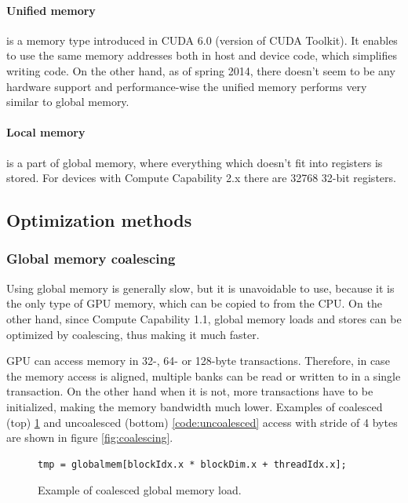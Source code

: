 \paragraph{Unified memory} is a memory type introduced in CUDA 6.0 (version of CUDA Toolkit). It enables to use the same memory addresses both in host and device code, which simplifies writing code. On the other hand, as of spring 2014, there doesn't seem to be any hardware support and performance-wise the unified memory performs very similar to global memory.

\paragraph{Local memory} is a part of global memory, where everything which doesn't fit into registers is stored. For devices with Compute Capability 2.x there are 32768 32-bit registers.



\subsection{Optimization methods}\label{subsec:optimization}

\subsubsection{Global memory coalescing}\label{subsubsec:cuda-coalescing}

Using global memory is generally slow, but it is unavoidable to use, because it is the only type of GPU memory, which can be copied to from the CPU. On the other hand, since Compute Capability 1.1, global memory loads and stores can be optimized by coalescing, thus making it much faster.

GPU can access memory in 32-, 64- or 128-byte transactions. Therefore, in case the memory access is aligned, multiple banks can be read or written to in a single transaction. On the other hand when it is not, more transactions have to be initialized, making the memory bandwidth much lower. Examples of coalesced (top) \ref{code:coalesced} and uncoalesced (bottom) \ref{code:uncoalesced} access with stride of 4 bytes are shown in figure \ref{fig:coalescing}.

\begin{figure}[ht]
\begin{verbatim}
tmp = globalmem[blockIdx.x * blockDim.x + threadIdx.x];
\end{verbatim}
\caption{Example of coalesced global memory load.}\label{code:coalesced}
\end{figure}

